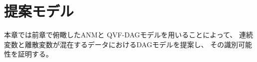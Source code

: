 
\section{提案モデル}
\label{part:proposal}

本章では前章で俯瞰したANM\cite{Park2020-ey}と
QVF-DAGモデル\cite{Park2017-hw}を用いることによって、
連続変数と離散変数が混在するデータにおけるDAGモデルを提案し、
その識別可能性を証明する。
%

%

